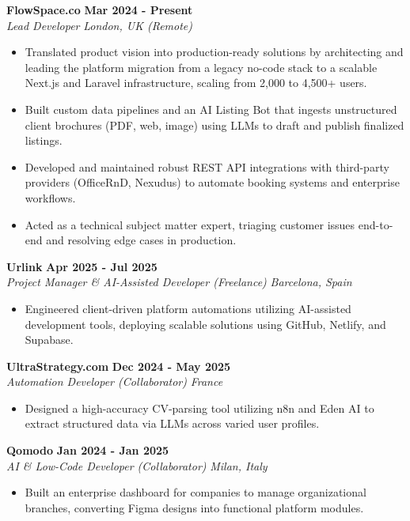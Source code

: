 \documentclass[11pt,a4paper]{article}
\begin{document}
\noindent \textbf{FlowSpace.co} \hfill \textbf{Mar 2024 - Present} \\
\textit{Lead Developer} \hfill \textit{London, UK (Remote)}
\begin{itemize}[leftmargin=*, noitemsep]
    \item Translated product vision into production-ready solutions by architecting and leading the platform migration from a legacy no-code stack to a scalable Next.js and Laravel infrastructure, scaling from 2,000 to 4,500+ users.
    \item Built custom data pipelines and an AI Listing Bot that ingests unstructured client brochures (PDF, web, image) using LLMs to draft and publish finalized listings.
    \item Developed and maintained robust REST API integrations with third-party providers (OfficeRnD, Nexudus) to automate booking systems and enterprise workflows.
    \item Acted as a technical subject matter expert, triaging customer issues end-to-end and resolving edge cases in production.
\end{itemize}

\vspace{8pt}
\noindent \textbf{Urlink} \hfill \textbf{Apr 2025 - Jul 2025} \\
\textit{Project Manager \& AI-Assisted Developer (Freelance)} \hfill \textit{Barcelona, Spain}
\begin{itemize}[leftmargin=*, noitemsep]
    \item Engineered client-driven platform automations utilizing AI-assisted development tools, deploying scalable solutions using GitHub, Netlify, and Supabase.
\end{itemize}

\vspace{8pt}
\noindent \textbf{UltraStrategy.com} \hfill \textbf{Dec 2024 - May 2025} \\
\textit{Automation Developer (Collaborator)} \hfill \textit{France}
\begin{itemize}[leftmargin=*, noitemsep]
    \item Designed a high-accuracy CV-parsing tool utilizing n8n and Eden AI to extract structured data via LLMs across varied user profiles.
\end{itemize}

\vspace{8pt}
\noindent \textbf{Qomodo} \hfill \textbf{Jan 2024 - Jan 2025} \\
\textit{AI \& Low-Code Developer (Collaborator)} \hfill \textit{Milan, Italy}
\begin{itemize}[leftmargin=*, noitemsep]
    \item Built an enterprise dashboard for companies to manage organizational branches, converting Figma designs into functional platform modules.
\end{itemize}
\end{document}
